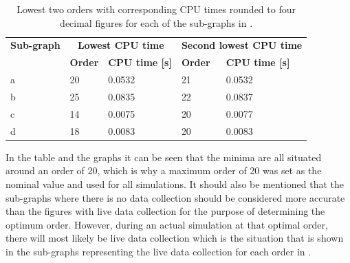 \begin{table}[H]
\begin{center}
\caption{Lowest two orders with corresponding CPU times rounded to four decimal figures for each of the sub-graphs in .}
\label{tab:orderAndCPUtimes}
\begin{tabular}{|l|l|l|l|l|}
\hline 
\textbf{Sub-graph}  & \multicolumn{2}{c|}{\textbf{Lowest CPU time}} & \multicolumn{2}{c|}{\textbf{Second lowest CPU time}} \\ \cline{2-5}

& \textbf{Order} &
\textbf{CPU time [s]} & \textbf{Order} & \textbf{CPU time [s]} \\ \hline \hline

a & 20 & 0.0532 & 21 & 0.0532 \\ \hline
b & 25 & 0.0835 & 22 & 0.0837 \\ \hline
c & 14 & 0.0075 & 20 & 0.0077 \\ \hline
d & 18 & 0.0083 & 20 & 0.0083 \\ \hline


\end{tabular}
\end{center}
\end{table}

\noindent
In the table and the graphs it can be seen that the minima are all situated around an order of 20, which is why a maximum order of 20 was set as the nominal value and used for all simulations. It should also be mentioned that the sub-graphs where there is no data collection should be considered more accurate than the figures with live data collection for the purpose of determining the optimum order. However, during an actual simulation at that optimal order, there will most likely be live data collection which is the situation that is shown in the sub-graphs representing the live data collection for each order in .


%
%


